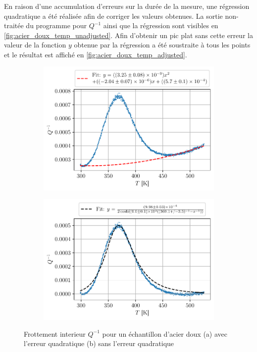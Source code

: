 En raison d'une accumulation d'erreurs sur la durée de la mesure, une régression quadratique a été réalisée afin de corriger les valeurs obtenues. La sortie non-traitée du programme pour $Q^{-1}$ ainsi que la régression sont visibles en \autoref{fig:acier_doux_temp_unadjusted}. Afin d'obtenir un pic plat sans cette erreur la valeur de la fonction $y$ obtenue par la régression a été soustraite à tous les points et le résultat est affiché en \autoref{fig:acier_doux_temp_adjusted}.

\begin{figure}[h]
    \centering
    \begin{subfigure}{0.6\linewidth}
        \centering
        \includegraphics[width=\linewidth]{figures/acier_doux_q_1_temp_unadjusted.pdf}
        \caption{}
        \label{fig:acier_doux_temp_unadjusted}
    \end{subfigure}
    \begin{subfigure}{0.6\linewidth}
        \centering
        \includegraphics[width=\linewidth]{figures/acier_doux_q_1_temp_adjusted.pdf}
        \caption{}
        \label{fig:acier_doux_temp_adjusted}
    \end{subfigure}
    \caption{Frottement interieur \(Q^{-1}\) pour un échantillon d'acier doux (a) avec l'erreur quadratique (b) sans l'erreur quadratique}
\end{figure}

